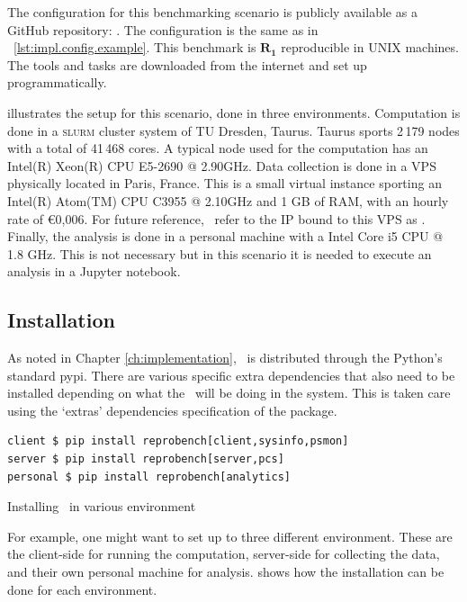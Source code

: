The configuration for this benchmarking scenario is publicly available as a GitHub repository: \href{https://github.com/rkkautsar/benchmark-demo-sat}{}.
The configuration is the same as in \lst~\ref{lst:impl.config.example}.
This benchmark is \(\bm{R_1}\) reproducible in UNIX machines.
The tools and tasks are downloaded from the internet and set up programmatically.

 illustrates the setup for this scenario, done in three environments.
Computation is done in a \textsc{slurm} cluster system \citep{yoo2003slurm} of TU Dresden, Taurus.
Taurus sports 2\,179 nodes with a total of 41\,468 cores.
A typical node used for the computation has an Intel(R) Xeon(R) CPU E5-2690 @ 2.90GHz.
Data collection is done in a VPS physically located in Paris, France.
This is a small virtual instance sporting an Intel(R) Atom(TM) CPU C3955 @ 2.10GHz and 1 GB of RAM, with an hourly rate of \euro{}0,006.
For future reference, \first~refer to the IP bound to this VPS as .
Finally, the analysis is done in a personal machine with a Intel Core i5 CPU @ 1.8 GHz.
This is not necessary but in this scenario it is needed to execute an analysis in a Jupyter notebook.

\subsection{Installation}

As noted in Chapter \ref{ch:implementation}, \OurBenchmarkingTool~is distributed through the Python's standard pypi.
There are various specific extra dependencies that also need to be installed depending on what the \OurBenchmarkingTool~will be doing in the system.
This is taken care using the `extras' dependencies specification of the package.

\begin{listing}
	\begin{verbatim}
client $ pip install reprobench[client,sysinfo,psmon]
server $ pip install reprobench[server,pcs]
personal $ pip install reprobench[analytics]
    \end{verbatim}
	\caption{Installing \OurBenchmarkingTool~in various environment}
	\label{lst:eval.install}
\end{listing}

For example, one might want to set up to three different environment.
These are the client-side for running the computation, server-side for collecting the data, and their own personal machine for analysis.
 shows how the installation can be done for each environment.

